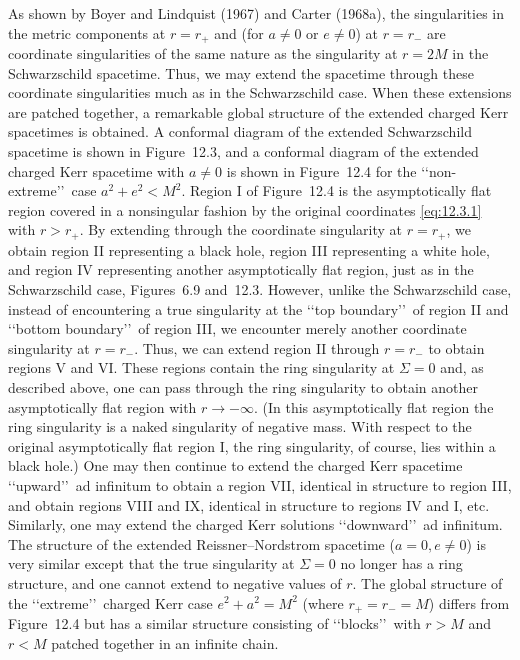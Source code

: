 As shown by Boyer and Lindquist (1967) and Carter (1968a), the singularities in the
metric components at \(r=r_+\) and (for \(a\ne0\) or \(e\ne0\)) at \(r=r_-\) are
coordinate singularities of the same nature as the singularity at \(r=2M\) in the
Schwarzschild spacetime. Thus, we may extend the spacetime through these coordinate
singularities much as in the Schwarzschild case. When these extensions are patched
together, a remarkable global structure of the extended charged Kerr spacetimes is
obtained. A conformal diagram of the extended Schwarzschild spacetime is shown in
Figure~12.3, and a conformal diagram of the extended charged Kerr spacetime with
\(a\ne0\) is shown in Figure~12.4 for the \lq\lq non-extreme\rq\rq\ case
\(a^2+e^2<M^2\). Region I of Figure~12.4 is the asymptotically flat region covered
in a nonsingular fashion by the original coordinates \eqref{eq:12.3.1} with
\(r>r_+\). By extending through the coordinate singularity at \(r=r_+\), we obtain
region II representing a black hole, region III representing a white hole, and region
IV representing another asymptotically flat region, just as in the Schwarzschild case,
Figures~6.9 and~12.3. However, unlike the Schwarzschild case, instead of
encountering a true singularity at the \lq\lq top boundary\rq\rq\ of region II and
\lq\lq bottom boundary\rq\rq\ of region III, we encounter merely another coordinate
singularity at \(r=r_-\). Thus, we can extend region II through \(r=r_-\) to obtain
regions V and VI. These regions contain the ring singularity at \(\Sigma=0\) and, as
described above, one can pass through the ring singularity to obtain another
asymptotically flat region with \(r\to-\infty\). (In this asymptotically flat region
the ring singularity is a naked singularity of negative mass. With respect to the
original asymptotically flat region I, the ring singularity, of course, lies within a
black hole.) One may then continue to extend the charged Kerr spacetime
\lq\lq upward\rq\rq\ ad infinitum to obtain a region VII, identical in structure to
region III, and obtain regions VIII and IX, identical in structure to regions IV and I,
etc. Similarly, one may extend the charged Kerr solutions \lq\lq downward\rq\rq\ ad
infinitum. The structure of the extended Reissner--Nordstrom spacetime
(\(a=0,e\ne0\)) is very similar except that the true singularity at \(\Sigma=0\) no
longer has a ring structure, and one cannot extend to negative values of \(r\). The
global structure of the \lq\lq extreme\rq\rq\ charged Kerr case \(e^2+a^2=M^2\)
(where \(r_+=r_-=M\)) differs from Figure~12.4 but has a similar structure
consisting of \lq\lq blocks\rq\rq\ with \(r>M\) and \(r<M\) patched together in an
infinite chain.


